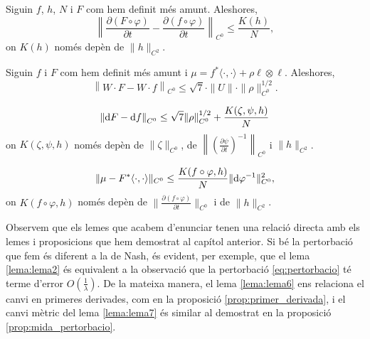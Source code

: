\begin{lema}
    \label{lema:lema3}
    Siguin $f$, $h$, $N$ i $F$ com hem definit més amunt. Aleshores,
    \begin{equation*}
        \left\|\frac{\partial (F\circ \varphi)}{\partial t}-\frac{\partial (f\circ \varphi)}{\partial t}\right\|_{C^0} \le \frac{K(h)}{N},
    \end{equation*}
    on $K(h)$ només depèn de $\|h\|_{C^2}$.
\end{lema}

\begin{lema}
    \label{lema:lema4}
    Siguin $f$ i $F$ com hem definit més amunt i $\mu = f^*\langle\cdot, \cdot\rangle + \rho\ell\otimes\ell$. Aleshores,
    \begin{equation*}
        \left\|W\cdot F-W\cdot f\right\|_{C^0} \le \sqrt7\cdot\|U\|\cdot\|\rho\|^{1/2}_{C^0}.
    \end{equation*}
\end{lema}

\begin{lema}
    \label{lema:lema6}
    \begin{equation*}
        \left\| \text dF -\text df \right\|_{C^0} \le \sqrt{7}\|\rho\|^{1/2}_{C^0} + \frac{K(\zeta,\psi,h)}{N}
    \end{equation*}
    on $K(\zeta,\psi,h)$ només depèn de $\|\zeta\|_{C^0}$, de $\left\|\left(  \frac{\partial\psi}{\partial t}\right)^{-1}\right\|_{C^0}$ i $\|h\|_{C^2}$.
\end{lema}

\begin{lema}
    \label{lema:lema7}
    \begin{equation*}
        \|\mu-F^*\langle\cdot, \cdot\rangle\|_{C^0} \le \frac{K(f\circ\varphi,h)}{N}\|\textrm d\varphi ^{-1}\|_{C^0}^2,
    \end{equation*}
    on $K(f\circ\varphi,h)$ només depèn de $\|\frac{\partial(f\circ\varphi)}{\partial t}\|_{C^0}$ i de $\|h\|_{C^2}$.
\end{lema}

\begin{obs}
    Observem que els lemes que acabem d'enunciar tenen una relació directa amb els lemes i proposicions que hem demostrat al capítol anterior. Si bé la pertorbació que fem és diferent a la de Nash, és evident, per exemple, que el lema \ref{lema:lema2} és equivalent a la observació que la pertorbació \eqref{eq:pertorbacio} té terme d'error $O\left(\frac{1}{\lambda}\right)$. De la mateixa manera, el lema \ref{lema:lema6} ens relaciona el canvi en primeres derivades, com en la proposició \ref{prop:primer_derivada}, i el canvi mètric del lema \ref{lema:lema7} és similar al demostrat en la proposició \ref{prop:mida_pertorbacio}.
\end{obs}
    
